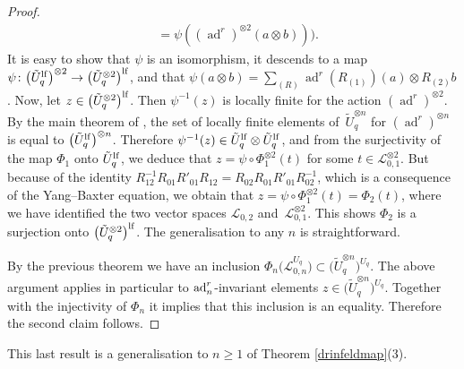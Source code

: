 \documentclass[pdftex]{sigma}%
\numberwithin{equation}{section}
\numberwithin{figure}{section}
\begin{document}
\begin{proof}
\begin{align*}
&=\psi((\operatorname{ad}^r)^{\otimes 2}(a\otimes b))) .
\end{align*}
It is easy to show that $\psi$ is an isomorphism, it descends to a map $\psi\colon \big(\tilde{U}_q^{\rm lf}\big)^{\otimes 2}\rightarrow \big({\tilde U}_q^{\otimes 2}\big)^{\rm lf}$, and that $\textstyle \psi(a\otimes b) = \sum_{(R)} \operatorname{ad}^r(R_{(1)})(a) \otimes R_{(2)}b$. Now, let $z\in \big({\tilde U}_q^{{\otimes} 2}\big)^{\rm lf}$. Then $\psi^{-1}(z)$ is locally finite for the action $(\operatorname{ad}^r)^{\otimes 2}$. By the main theorem of \cite{KLNY}, the set of locally finite elements of~${\tilde U}_q^{{\otimes} n}$ for $(\operatorname{ad}^r)^{\otimes n}$ is equal to $\big({\tilde U}_q^{\rm lf}\big)^{\otimes n}$. Therefore $\psi^{-1}(z)\in {\tilde U}_q^{\rm lf}\otimes {\tilde U}_q^{\rm lf}$, and from the surjectivity of the map $\Phi_1$ onto ${\tilde U}_q^{\rm lf}$, we deduce that $z=\psi\circ \Phi_1^{\otimes 2}(t)$ for some $t \in {\mathcal L}_{0,1}^{\otimes 2}$. But because of the identity $R_{12}^{-1}R_{01}R'_{01}R_{12}=R_{02}R_{01}R'_{01}R_{02}^{-1}$, which is a consequence of the Yang--Baxter equation, we obtain that $z=\psi\circ \Phi_1^{\otimes 2}(t)=\Phi_2(t)$, where we have identified the two vector spaces ${\mathcal L}_{0,2}$ and~${\mathcal L}_{0,1}^{\otimes 2}$. This shows $\Phi_2$ is a surjection onto $\big({\tilde U}_q^{{\otimes} 2}\big)^{\rm lf}$. The generalisation to any $n$ is straightforward.

By the previous theorem we have an inclusion $\Phi_n\big({\mathcal L}_{0,n}^{U_q}\big)\subset \big({\tilde U}_q^{{\otimes} n}\big)^{U_q}$. The above argument applies in particular to ${\rm ad}_n^r$-invariant elements $z\in \big({\tilde U}_q^{{\otimes} n}\big)^{U_q}$. Together with the injectivity of $\Phi_n$ it implies that this inclusion is an equality. Therefore the second claim follows.\end{proof}

\begin{remk}
This last result is a generalisation to $n\geq 1$ of Theorem \ref{drinfeldmap}(3).
\end{remk}
\end{document}

